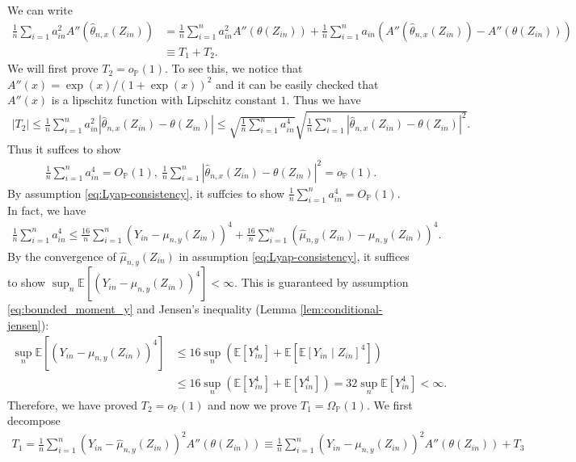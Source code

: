 \documentclass[12pt]{article}
\theoremstyle{definition}
\def\P{\mathbb{P}}
\def\P{\mathbb{P}}
\newcommand{\E}{\mathbb E}								%
\renewcommand{\P}{\mathbb{P}}							%
\newcommand{\srz}{Z}									%
\newcommand{\sry}{Y}									%
\begin{document}
	We can write 
	\begin{align*}
		\frac{1}{n}\sum_{i=1}a_{in}^2A''(\widehat \theta_{n,x}(\srz_{in}))
		&
		=\frac{1}{n}\sum_{i=1}^n a_{in}^2A''(\theta(\srz_{in}))+\frac{1}{n}\sum_{i=1}^n a_{in}(A''(\widehat \theta_{n,x}(\srz_{in}))-A''(\theta(\srz_{in})))\\
		&
		\equiv T_1+T_2.
	\end{align*}
	We will first prove $T_2=o_{\P}(1)$. To see this, we notice that $A''(x)=\exp(x)/ (1+\exp(x))^2$ and it can be easily checked that $A''(x)$ is a lipschitz function with Lipschitz constant $1$. Thus we have
	\begin{align*}
		|T_2|\leq \frac{1}{n}\sum_{i=1}^n a_{in}^2|\widehat \theta_{n,x}(\srz_{in})-\theta(\srz_{in})|\leq \sqrt{\frac{1}{n}\sum_{i=1}^n a_{in}^4}\sqrt{\frac{1}{n}\sum_{i=1}^n |\widehat \theta_{n,x}(\srz_{in})-\theta(\srz_{in})|^2}.
	\end{align*}
	Thus it suffces to show 
	\begin{align}
		\frac{1}{n}\sum_{i=1}^n a_{in}^4=O_{\P}(1),\ \frac{1}{n}\sum_{i=1}^n |\widehat \theta_{n,x}(\srz_{in})-\theta(\srz_{in})|^2=o_{\P}(1).\label{eq:fourth_moment_a}
	\end{align}
	By assumption \eqref{eq:Lyap-consistency}, it suffcies to show $\frac{1}{n}\sum_{i=1}^n a_{in}^4=O_{\P}(1)$. In fact, we have
	\begin{align*}
		\frac{1}{n}\sum_{i=1}^n a_{in}^4\leq \frac{16}{n}\sum_{i=1}^n (\sry_{in}-\mu_{n,y}(\srz_{in}))^4+\frac{16}{n}\sum_{i=1}^n (\widehat{\mu}_{n,y}(\srz_{in})-\mu_{n,y}(\srz_{in}))^4.
	\end{align*}
	By the convergence of $\widehat{\mu}_{n,y}(\srz_{in})$ in assumption \eqref{eq:Lyap-consistency}, it suffices to show $\sup_n\E[(\sry_{in}-\mu_{n,y}(\srz_{in}))^4]<\infty$. This is guaranteed by assumption \eqref{eq:bounded_moment_y} and Jensen's inequality (Lemma \ref{lem:conditional-jensen}):
	\begin{align*}
		\sup_n\E[(\sry_{in}-\mu_{n,y}(\srz_{in}))^4]
		&
		\leq 16\sup_n(\E[\sry_{in}^4]+\E[\E[\sry_{in}\mid\srz_{in}]^4])\\
		&
		\leq  16\sup_n(\E[\sry_{in}^4]+\E[\sry_{in}^4])=32\sup_n\E[\sry_{in}^4]<\infty.
	\end{align*}
	Therefore, we have proved $T_2=o_{\P}(1)$ and now we prove $T_1=\Omega_{\P}(1)$. We first decompose 
	\begin{align*}
		T_1=\frac{1}{n}\sum_{i=1}^n (\sry_{in}-\widehat{\mu}_{n,y}(\srz_{in}))^2A''(\theta(\srz_{in}))\equiv\frac{1}{n}\sum_{i=1}^n (\sry_{in}-\mu_{n,y}(\srz_{in}))^2A''(\theta(\srz_{in}))+T_3
	\end{align*}
\end{document}
